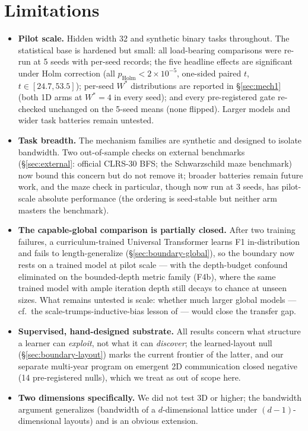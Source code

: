 \documentclass[11pt]{article}
\newcommand{\Wstar}{W^{*}}
\newcommand{\pholm}{p_{\mathrm{Holm}}}
\begin{document}
\section{Limitations}\label{sec:limitations}

\begin{itemize}
\item \textbf{Pilot scale.} Hidden width 32 and synthetic binary tasks
  throughout. The statistical base is hardened but small: all load-bearing
  comparisons were re-run at 5 seeds with per-seed records; the five headline
  effects are significant under Holm correction (all
  $\pholm < 2\times10^{-5}$, one-sided paired $t$, $t \in [24.7, 53.5]$);
  per-seed $\Wstar$ distributions are reported in \S\ref{sec:mech1} (both 1D
  arms at $\Wstar = 4$ in every seed); and every pre-registered gate
  re-checked unchanged on the 5-seed means (none flipped). Larger models and
  wider task batteries remain untested.
\item \textbf{Task breadth.} The mechanism families are synthetic and
  designed to isolate bandwidth. Two out-of-sample checks on external
  benchmarks (\S\ref{sec:external}: official CLRS-30 BFS; the Schwarzschild
  maze benchmark) now bound this concern but do not remove it; broader
  batteries remain future work, and the maze check in particular, though now
  run at 3 seeds, has pilot-scale absolute performance (the ordering is
  seed-stable but neither arm masters the benchmark).
\item \textbf{The capable-global comparison is partially closed.} After two
  training failures, a curriculum-trained Universal Transformer learns F1
  in-distribution and fails to length-generalize
  (\S\ref{sec:boundary-global}), so the boundary now rests on a trained
  model at pilot scale --- with the depth-budget confound eliminated on the
  bounded-depth metric family (F4b), where the same trained model with
  ample iteration depth still decays to chance at unseen sizes. What
  remains untested is scale: whether much larger
  global models --- cf.\ the scale-trumps-inductive-bias lesson of
  \citet{dosovitskiy2021vit} --- would close the transfer gap.
\item \textbf{Supervised, hand-designed substrate.} All results concern what
  structure a learner can \emph{exploit}, not what it can \emph{discover};
  the learned-layout null (\S\ref{sec:boundary-layout}) marks the current
  frontier of the latter, and our separate multi-year program on emergent 2D
  communication closed negative (14 pre-registered nulls), which we treat as
  out of scope here.
\item \textbf{Two dimensions specifically.} We did not test 3D or higher; the
  bandwidth argument generalizes (bandwidth of a $d$-dimensional lattice
  under $(d{-}1)$-dimensional layouts) and is an obvious extension.
\end{itemize}
\end{document}
